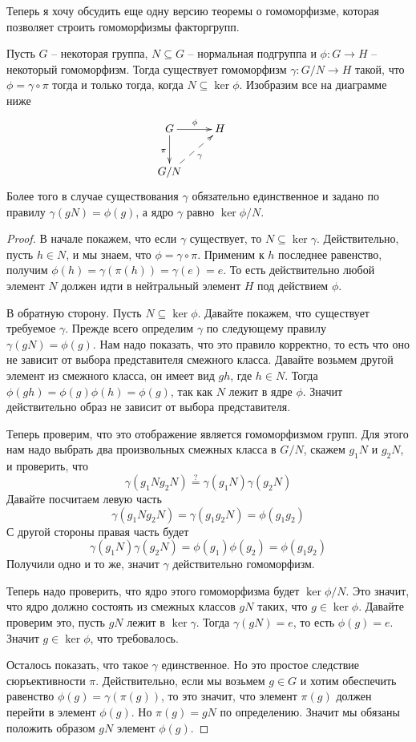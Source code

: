 Теперь я хочу обсудить еще одну версию теоремы о гомоморфизме, которая позволяет строить гомоморфизмы факторгрупп.

\begin{claim}
Пусть $G$ -- некоторая группа, $N\subseteq G$ -- нормальная подгруппа и $\phi\colon G\to H$ -- некоторый гомоморфизм.
Тогда существует гомоморфизм $\gamma \colon G/N \to H$ такой, что $\phi = \gamma \circ \pi$ тогда и только тогда, когда $N\subseteq \ker \phi$.
Изобразим все на диаграмме ниже
\[
\xymatrix{
	{G}\ar[r]^{\phi}\ar[d]_{\pi}&{H}&\\
	{G/N}\ar@{-->}[ru]_{\gamma}&{}
}
\]
Более того в случае существования $\gamma$ обязательно единственное и задано по правилу $\gamma(gN) = \phi(g)$, а ядро $\gamma$ равно $\ker \phi / N$.
\end{claim}
\begin{proof}
В начале покажем, что если $\gamma$ существует, то $N\subseteq \ker \gamma$.
Действительно, пусть $h\in N$, и мы знаем, что $\phi = \gamma \circ \pi$.
Применим к $h$ последнее равенство, получим $\phi(h) = \gamma(\pi(h)) = \gamma(e) = e$.
То есть действительно любой элемент $N$ должен идти в нейтральный элемент $H$ под действием $\phi$.

В обратную сторону.
Пусть $N\subseteq \ker \phi$.
Давайте покажем, что существует требуемое $\gamma$.
Прежде всего определим $\gamma$ по следующему правилу $\gamma(gN) = \phi(g)$.
Нам надо показать, что это правило корректно, то есть что оно не зависит от выбора представителя смежного класса.
Давайте возьмем другой элемент из смежного класса, он имеет вид $gh$, где $h\in N$.
Тогда $\phi(gh) = \phi(g) \phi(h) = \phi(g)$, так как $N$ лежит в ядре $\phi$.
Значит действительно образ не зависит от выбора представителя.

Теперь проверим, что это отображение является гомоморфизмом групп.
Для этого нам надо выбрать два произвольных смежных класса в $G/N$, скажем $g_1 N$ и $g_2N$, и проверить, что
\[
\gamma(g_1  N g_2  N) \stackrel{?}{=} \gamma(g_1  N) \gamma (g_2  N)
\]
Давайте посчитаем левую часть
\[
\gamma(g_1  N g_2  N) = \gamma(g_1 g_2 N) = \phi(g_1g_2)
\]
С другой стороны правая часть будет
\[
\gamma(g_1N) \gamma(g_2 N) = \phi(g_1) \phi(g_2) = \phi(g_1 g_2)
\]
Получили одно и то же, значит $\gamma$ действительно гомоморфизм.

Теперь надо проверить, что ядро этого гомоморфизма будет $\ker \phi / N$.
Это значит, что ядро должно состоять из смежных классов $gN$ таких, что $g\in \ker \phi$.
Давайте проверим это, пусть $gN$ лежит в $\ker \gamma$.
Тогда $\gamma(gN) = e$, то есть $\phi(g) = e$.
Значит $g\in \ker \phi$, что требовалось.

Осталось показать, что такое $\gamma$ единственное.
Но это простое следствие сюръективности $\pi$.
Действительно, если мы возьмем $g\in G$ и хотим обеспечить равенство $\phi(g) = \gamma(\pi(g))$, то это значит, что элемент $\pi(g)$ должен перейти в элемент $\phi(g)$.
Но $\pi(g)= gN$ по определению.
Значит мы обязаны положить образом $gN$ элемент $\phi(g)$.
\end{proof}

